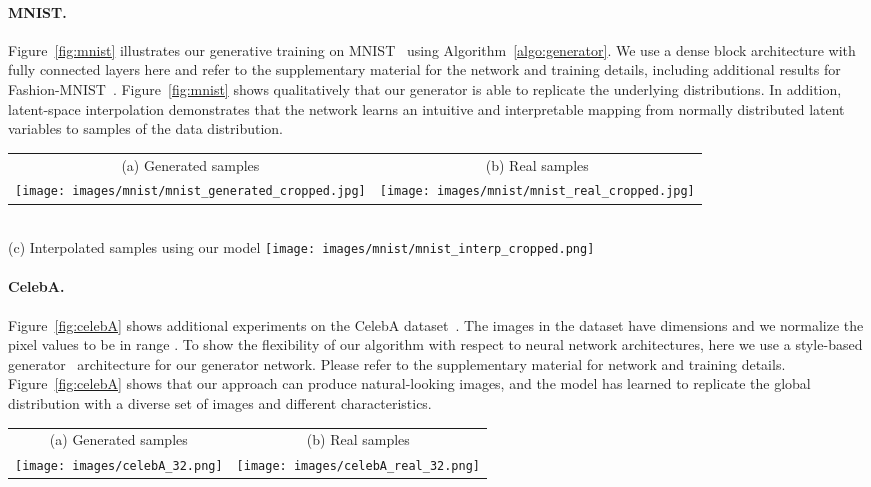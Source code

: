 \documentclass{article}
\begin{document}
\paragraph{MNIST.} Figure~\ref{fig:mnist} illustrates our generative training on MNIST~\citep{lecun1998mnist} using Algorithm~\ref{algo:generator}. We use a dense block architecture with fully connected layers here and refer to the supplementary material for the network and training details, including additional results for Fashion-MNIST~\citep{xiao2017fashion}. Figure~\ref{fig:mnist} shows qualitatively that our generator is able to replicate the underlying distributions. In addition, latent-space interpolation demonstrates that the network learns an intuitive and interpretable mapping from normally distributed latent variables to samples of the data distribution. 

 \begin{figure*}[t]
\centering
\begin{tabular} {cc}
(a) Generated samples & (b) Real samples\\
\texttt{[image: images/mnist/mnist\_generated\_cropped.jpg]} &
\texttt{[image: images/mnist/mnist\_real\_cropped.jpg]} 
\end{tabular}  \\
(c) Interpolated samples using our model
\texttt{[image: images/mnist/mnist\_interp\_cropped.png]} 
\caption[MNIST generated results.]
{
Generated MNIST (a), from the dataset (b), and latent space interpolation (c).
}
\label{fig:mnist}
\end{figure*}

\paragraph{CelebA.} Figure~\ref{fig:celebA} shows additional experiments on the CelebA dataset~\citep{liu2015deep}. 
The images in the dataset have  dimensions and we normalize the pixel values to be in range .
To show the flexibility of our algorithm with respect to neural network architectures, here we use a style-based generator~\citep{karras2019style} architecture for our generator network. Please refer to the supplementary material for network and training details. Figure~\ref{fig:celebA} shows that our approach can produce natural-looking images, and the model has learned to replicate the global distribution with a diverse set of images and different characteristics.

\begin{figure*}[t]
\centering
\begin{tabular} {cc}
(a) Generated samples & (b) Real samples\\
\texttt{[image: images/celebA\_32.png]} &
\texttt{[image: images/celebA\_real\_32.png]} 
\end{tabular} 
\caption[celebA generated results.]
{
Generated results on  images from the celebA dataset~\citep{liu2015deep}.
}
\label{fig:celebA}
\end{figure*}
\end{document}
